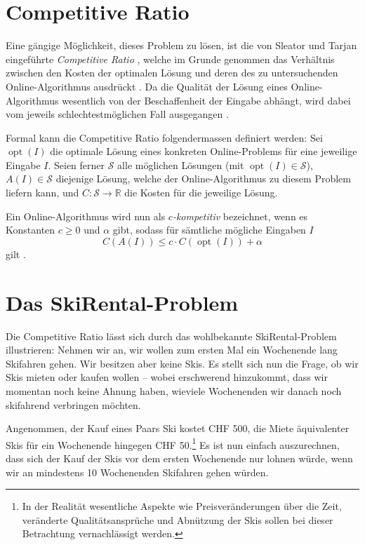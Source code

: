 \documentclass[11pt]{scrreprt} %
\theoremstyle{definition}
\begin{document}
\section{Competitive Ratio}

Eine gängige Möglichkeit, dieses Problem zu lösen, ist die von Sleator und Tarjan eingeführte {\it Competitive Ratio} \cite{Sleator, BKK}, welche im Grunde genommen das Verhältnis zwischen den Kosten der optimalen Lösung und deren des zu untersuchenden Online-Algorithmus ausdrückt \cite{BKK}. Da die Qualität der Lösung eines Online-Algorithmus wesentlich von der Beschaffenheit der Eingabe abhängt, wird dabei vom jeweils schlechtestmöglichen Fall ausgegangen \cite{Trevisan}.

\bigskip
Formal kann die Competitive Ratio folgendermassen definiert werden: Sei $\operatorname{opt}(I)$ die optimale Lösung eines konkreten Online-Problems für eine jeweilige Eingabe $I$. Seien ferner $\mathcal{S}$ alle möglichen Lösungen (mit $\operatorname{opt}(I) \in \mathcal{S}$), $A(I) \in \mathcal{S}$ diejenige Lösung, welche der Online-Algorithmus zu diesem Problem liefern kann, und $C : \mathcal{S} \rightarrow \mathbb{R}$ die Kosten für die jeweilige Lösung.

\bigskip
Ein Online-Algorithmus wird nun als {\it $c$-kompetitiv} bezeichnet, wenn es Konstanten $c \ge 0$ und $\alpha$ gibt, sodass für sämtliche mögliche Eingaben $I$
\[
C(A(I)) \le c\cdot C(\operatorname{opt}(I)) + \alpha
\]
gilt \cite{BKK}.

\section{Das {\sc SkiRental}-Problem}

Die Competitive Ratio lässt sich durch das wohlbekannte {\sc SkiRental}-Problem illustrieren: Nehmen wir an, wir wollen zum ersten Mal ein Wochenende lang Skifahren gehen. Wir besitzen aber keine Skis. Es stellt sich nun die Frage, ob wir Skis mieten oder kaufen wollen -- wobei erschwerend hinzukommt, dass wir momentan noch keine Ahnung haben, wieviele Wochenenden wir danach noch skifahrend verbringen möchten.

Angenommen, der Kauf eines Paars Ski kostet CHF 500, die Miete äquivalenter Skis für ein Wochenende hingegen CHF 50.\footnote{In der Realität wesentliche Aspekte wie Preisveränderungen über die Zeit, veränderte Qualitätsansprüche und Abnützung der Skis sollen bei dieser Betrachtung vernachlässigt werden.} Es ist nun einfach auszurechnen, dass sich der Kauf der Skis vor dem ersten Wochenende nur lohnen würde, wenn wir an mindestens 10 Wochenenden Skifahren gehen würden.
\end{document}

